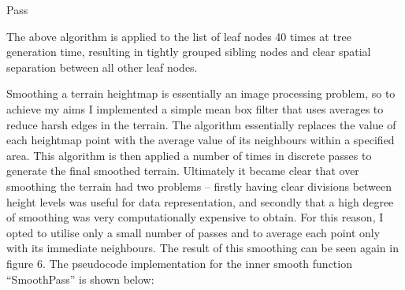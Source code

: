 \documentclass[10pt,letterpaper]{article}
\begin{document}
\begin{algorithm}[H]
  



\caption{Pass}
\end{algorithm}

The above algorithm is applied to the list of leaf nodes 40 times at tree generation time, resulting in tightly grouped sibling nodes and clear spatial separation between all other leaf nodes.


Smoothing a terrain heightmap is essentially an image processing problem, so to achieve my aims I implemented a simple mean box filter that uses averages to reduce harsh edges in the terrain. The algorithm essentially replaces the value of each heightmap point with the average value of its neighbours within a specified area. This algorithm is then applied a number of times in discrete passes to generate the final smoothed terrain. Ultimately it became clear that over smoothing the terrain had two problems – firstly having clear divisions between height levels was useful for data representation, and secondly that a high degree of smoothing was very computationally expensive to obtain. For this reason, I opted to utilise only a small number of passes and to average each point only with its immediate neighbours. The result of this smoothing can be seen again in figure 6.
The pseudocode implementation for the inner smooth function “SmoothPass” is shown below:
\end{document}
